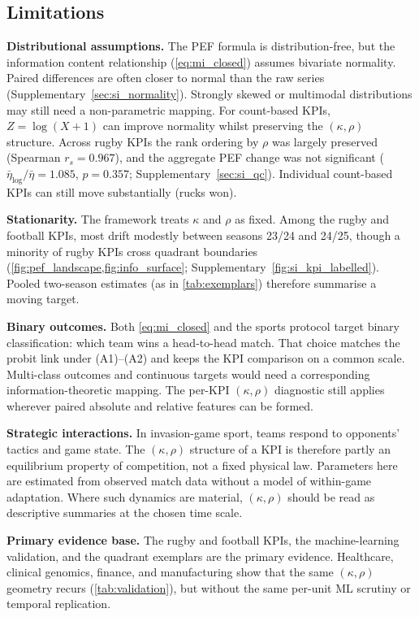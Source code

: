 \subsection{Limitations}

\textbf{Distributional assumptions.} The PEF formula is distribution-free, but the information content relationship (\cref{eq:mi_closed}) assumes bivariate normality. Paired differences are often closer to normal than the raw series (Supplementary~\cref{sec:si_normality}). Strongly skewed or multimodal distributions may still need a non-parametric mapping. For count-based KPIs, $Z=\log(X+1)$ can improve normality whilst preserving the $(\kappa,\rho)$ structure. Across \PEFrugbyNkpis{} rugby KPIs the rank ordering by $\rho$ was largely preserved (Spearman $r_{s}=0.967$), and the aggregate PEF change was not significant ($\bar{\eta}_{\log}/\bar{\eta}=1.085$, $p=0.357$; Supplementary~\cref{sec:si_qc}). Individual count-based KPIs can still move substantially (rucks won).

\textbf{Stationarity.} The framework treats $\kappa$ and $\rho$ as fixed. Among the rugby and football KPIs, most drift modestly between seasons 23/24 and 24/25, though a minority of rugby KPIs cross quadrant boundaries (\cref{fig:pef_landscape,fig:info_surface}; Supplementary~\cref{fig:si_kpi_labelled}). Pooled two-season estimates (as in \cref{tab:exemplars}) therefore summarise a moving target.

\textbf{Binary outcomes.} Both \cref{eq:mi_closed} and the sports protocol target binary classification: which team wins a head-to-head match. That choice matches the probit link under (A1)--(A2) and keeps the KPI comparison on a common scale. Multi-class outcomes and continuous targets would need a corresponding information-theoretic mapping. The per-KPI $(\kappa,\rho)$ diagnostic still applies wherever paired absolute and relative features can be formed.

\textbf{Strategic interactions.} In invasion-game sport, teams respond to opponents' tactics and game state. The $(\kappa,\rho)$ structure of a KPI is therefore partly an equilibrium property of competition, not a fixed physical law. Parameters here are estimated from observed match data without a model of within-game adaptation. Where such dynamics are material, $(\kappa,\rho)$ should be read as descriptive summaries at the chosen time scale.

\textbf{Primary evidence base.} The rugby and football KPIs, the machine-learning validation, and the quadrant exemplars are the primary evidence. Healthcare, clinical genomics, finance, and manufacturing show that the same $(\kappa,\rho)$ geometry recurs (\cref{tab:validation}), but without the same per-unit ML scrutiny or temporal replication.

